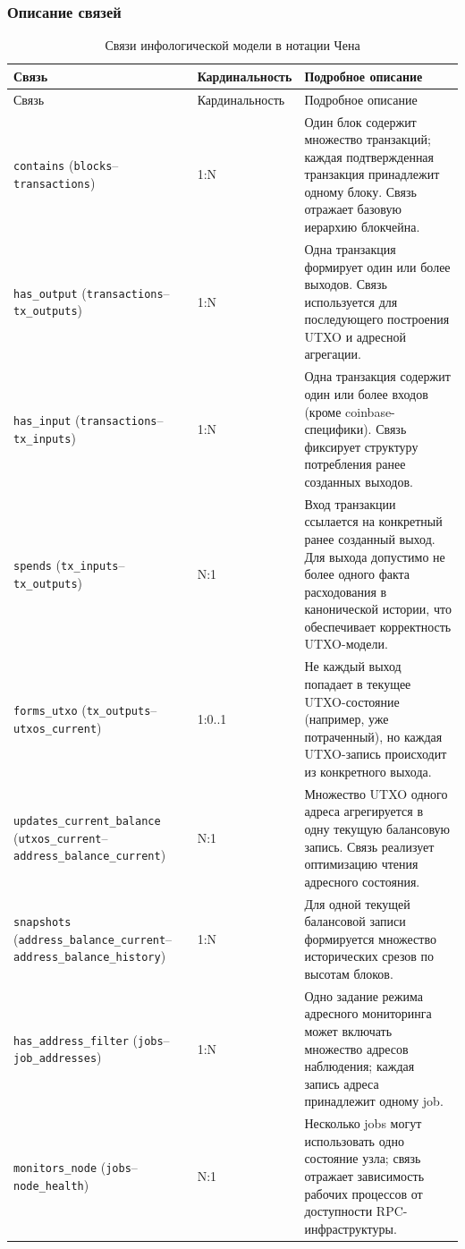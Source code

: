 ﻿\documentclass[14pt,a4paper]{extarticle}
\begin{document}
\subsubsection{Описание связей}
\begin{longtable}{p{} p{} p{}}
\caption{Связи инфологической модели в нотации Чена} \\
\toprule
Связь & Кардинальность & Подробное описание \\
\midrule
\endfirsthead
\toprule
Связь & Кардинальность & Подробное описание \\
\midrule
\endhead
\texttt{contains} (\texttt{blocks}--\texttt{transactions}) & 1:N & Один блок содержит множество транзакций; каждая подтвержденная транзакция принадлежит одному блоку. Связь отражает базовую иерархию блокчейна. \\
\texttt{has\_output} (\texttt{transactions}--\texttt{tx\_outputs}) & 1:N & Одна транзакция формирует один или более выходов. Связь используется для последующего построения UTXO и адресной агрегации. \\
\texttt{has\_input} (\texttt{transactions}--\texttt{tx\_inputs}) & 1:N & Одна транзакция содержит один или более входов (кроме coinbase-специфики). Связь фиксирует структуру потребления ранее созданных выходов. \\
\texttt{spends} (\texttt{tx\_inputs}--\texttt{tx\_outputs}) & N:1 & Вход транзакции ссылается на конкретный ранее созданный выход. Для выхода допустимо не более одного факта расходования в канонической истории, что обеспечивает корректность UTXO-модели. \\
\texttt{forms\_utxo} (\texttt{tx\_outputs}--\texttt{utxos\_current}) & 1:0..1 & Не каждый выход попадает в текущее UTXO-состояние (например, уже потраченный), но каждая UTXO-запись происходит из конкретного выхода. \\
\texttt{updates\_current\_balance} (\texttt{utxos\_current}--\texttt{address\_balance\_current}) & N:1 & Множество UTXO одного адреса агрегируется в одну текущую балансовую запись. Связь реализует оптимизацию чтения адресного состояния. \\
\texttt{snapshots} (\texttt{address\_balance\_current}--\texttt{address\_balance\_history}) & 1:N & Для одной текущей балансовой записи формируется множество исторических срезов по высотам блоков. \\
\texttt{has\_address\_filter} (\texttt{jobs}--\texttt{job\_addresses}) & 1:N & Одно задание режима адресного мониторинга может включать множество адресов наблюдения; каждая запись адреса принадлежит одному job. \\
\texttt{monitors\_node} (\texttt{jobs}--\texttt{node\_health}) & N:1 & Несколько jobs могут использовать одно состояние узла; связь отражает зависимость рабочих процессов от доступности RPC-инфраструктуры. \\
\bottomrule
\end{longtable}
\end{document}
